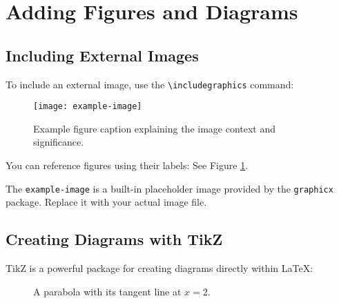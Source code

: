 \documentclass[11pt,a4paper]{article}
\begin{document}
\section{Adding Figures and Diagrams}

\subsection{Including External Images}

To include an external image, use the \verb|\includegraphics| command:

\begin{figure}[H] %
    \centering
    \texttt{[image: example-image]} %
    \caption{Example figure caption explaining the image context and significance.}
    \label{fig:example}
\end{figure}

You can reference figures using their labels: See Figure \ref{fig:example}.

\begin{notebox}
The \verb|example-image| is a built-in placeholder image provided by the \verb|graphicx| package. Replace it with your actual image file.
\end{notebox}

\subsection{Creating Diagrams with TikZ}

TikZ is a powerful package for creating diagrams directly within LaTeX:

\begin{figure}[H]
    \centering
    \caption{A parabola with its tangent line at $x = 2$.}
    \label{fig:parabola}
\end{figure}
\end{document}
